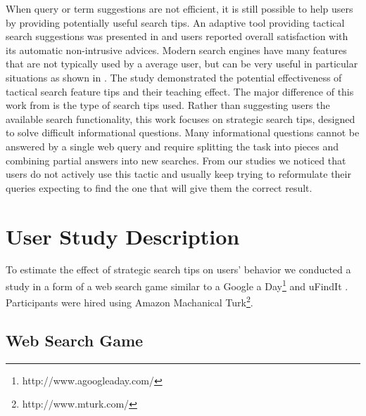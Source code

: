 \documentclass{sig-alternate}
\begin{document}
When query or term suggestions are not efficient, it is still possible to help users by providing potentially useful search tips.
An adaptive tool providing tactical search suggestions was presented in \cite{Kriewel2007} and users reported overall satisfaction with its automatic non-intrusive advices.
Modern search engines have many features that are not typically used by a average user, but can be very useful in particular situations as shown in \cite{Moraveji:2011:MIU:2009916.2009966}. The study demonstrated the potential effectiveness of tactical search feature tips and their teaching effect.
The major difference of this work from \cite{Moraveji:2011:MIU:2009916.2009966} is the type of search tips used.
Rather than suggesting users the available search functionality, this work focuses on strategic search tips, designed to solve difficult informational questions.
Many informational questions cannot be answered by a single web query and require splitting the task into pieces and combining partial answers into new searches. From our studies we noticed that users do not actively use this tactic and usually keep trying to reformulate their queries expecting to find the one that will give them the correct result.


\section{User Study Description}

To estimate the effect of strategic search tips on users' behavior we conducted a study in a form of a web search game similar to a Google a Day\footnote{http://www.agoogleaday.com/} and uFindIt \cite{Ageev:2011:FYG:2009916.2009965}. Participants were hired using Amazon Machanical Turk\footnote{http://www.mturk.com/}. 

\subsection{Web Search Game}
\end{document}
